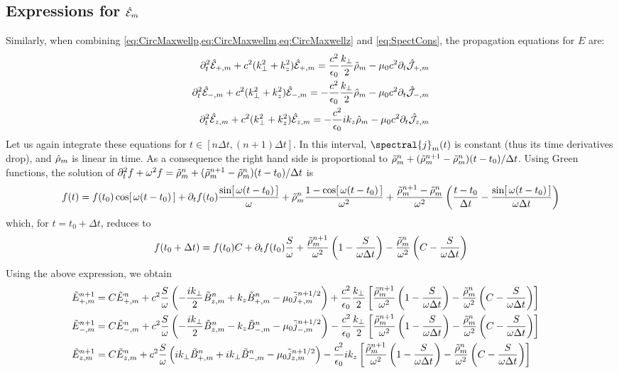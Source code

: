 \subsection{Expressions for $\hat{\mathcal{E}}_m$}

Similarly, when combining \cref{eq:CircMaxwellp,eq:CircMaxwellm,eq:CircMaxwellz}
and \cref{eq:SpectCons}, the propagation equations for $E$ are:
\begin{align*}
\partial_t^2 \hat{\mathcal{E}}_{+,m} + c^2(k_\perp^2 + k_z^2) \hat{\mathcal{E}}_{+,m}
= \frac{c^2}{\epsilon_0} \frac{k_\perp}{2} \hat{\mathcal{\rho}}_m -
\mu_0c^2 \partial_t\hat{\mathcal{J}}_{+,m} \\
\partial_t^2 \hat{\mathcal{E}}_{-,m} + c^2(k_\perp^2 + k_z^2) \hat{\mathcal{E}}_{-,m}
= - \frac{c^2}{\epsilon_0} \frac{k_\perp}{2} \hat{\mathcal{\rho}}_m -
\mu_0c^2 \partial_t\hat{\mathcal{J}}_{-,m} \\
\partial_t^2 \hat{\mathcal{E}}_{z,m} + c^2(k_\perp^2 + k_z^2) \hat{\mathcal{E}}_{z,m}
= - \frac{c^2}{\epsilon_0} i k_z \hat{\mathcal{\rho}}_m -
\mu_0c^2 \partial_t\hat{\mathcal{J}}_{z,m} 
\end{align*}
Let us again integrate these equations for $t\in [n\Delta t, (n+1)\Delta
t]$. In this interval, $\spectral{j}_m(t)$ is constant (thus its time
derivatives drop), and $\hat{\mathcal{\rho}}_m$ is linear in time. As a
consequence the right hand side is proportional to $\tilde{\rho}_{m}^{n} +
(\tilde{\rho}_{m}^{n+1}-\tilde{\rho}_{m}^{n})(t-t_0)/\Delta t$. Using Green functions, the solution of 
$ \partial_t^2 f + \omega^2 f = \tilde{\rho}_{m}^{n} + (\tilde{\rho}_{m}^{n+1}-\tilde{\rho}_{m}^{n})(t-t_0)/\Delta t $ is
\[ f(t) = f(t_0) \cos[\,\omega(t-t_0)\,] + \partial_tf (t_0)
\frac{\sin[\,\omega(t-t_0)\,]}{\omega} + \tilde{\rho}_{m}^{n}\frac{1-
  \cos[\,\omega(t-t_0)\,]}{\omega^2} + \frac{\tilde{\rho}_{m}^{n+1}-\tilde{\rho}_{m}^{n}}{\omega^2}\left(
  \frac{t-t_0}{\Delta t} - \frac{\sin[\,\omega(t-t_0)\,]}{\omega
    \Delta t}
\right) \]
which, for $t=t_0 +\Delta t$, reduces to
\[ f(t_0 +\Delta t) = f(t_0) C + \partial_tf (t_0)
\frac{S}{\omega} 
+ \frac{\tilde{\rho}_{m}^{n+1}}{\omega^2}\left( 1 - \frac{S}{\omega\Delta t}\right) 
- \frac{\tilde{\rho}_{m}^{n}}{\omega^2}\left( C - \frac{S}{\omega\Delta t}\right) \]
Using the above expression, we obtain
\begin{align*}
\tilde{E}_{+,m}^{n+1} = \; & C \tilde{E}_{+,m}^{n} + 
c^2\frac{S}{\omega}\left(-\frac{ik_\perp }{2} \tilde{B}_{z,m}^{n} + k_z\tilde{B}_{+,m}^{n}
- \mu_0 \tilde{j}_{+,m}^{n+1/2} \right) + \frac{c^2}{\epsilon_0}
\frac{k_\perp}{2}\left[ \frac{\tilde{\rho}_{m}^{n+1}}{\omega^2}\left(
  1 - \frac{S}{\omega\Delta t}\right) -
\frac{\tilde{\rho}_{m}^{n}}{\omega^2}\left( C -\frac{S}{\omega\Delta t}\right)\right]  & \\
\tilde{E}_{-,m}^{n+1} =\; & C \tilde{E}_{-,m}^{n} +
c^2\frac{S}{\omega}\left(- \frac{ik_\perp }{2} \tilde{B}_{z,m}^{n} - k_z\tilde{B}_{-,m}^{n}
- \mu_0 \tilde{j}_{-,m}^{n+1/2} \right) - \frac{c^2}{\epsilon_0}
\frac{k_\perp}{2}\left[ \frac{\tilde{\rho}_{m}^{n+1}}{\omega^2}\left(
  1 - \frac{S}{\omega\Delta t}\right) - \frac{\tilde{\rho}_{m}^{n}}{\omega^2}
\left( C - \frac{S}{\omega\Delta t}\right)\right]  &\\
\tilde{E}_{z,m}^{n+1} =\; & C \tilde{E}_{z,m}^{n} + 
c^2\frac{S}{\omega}\left(ik_\perp \tilde{B}_{+,m}^{n} + ik_\perp \tilde{B}_{-,m}^{n}
- \mu_0 \tilde{j}_{z,m}^{n+1/2} \right) - \frac{c^2}{\epsilon_0}
ik_z\left[ \frac{\tilde{\rho}_{m}^{n+1}}{\omega^2}\left(
  1 - \frac{S}{\omega\Delta t}\right) - \frac{\tilde{\rho}_{m}^{n}}{\omega^2}
\left( C - \frac{S}{\omega\Delta t}\right)\right]  &
\end{align*}

